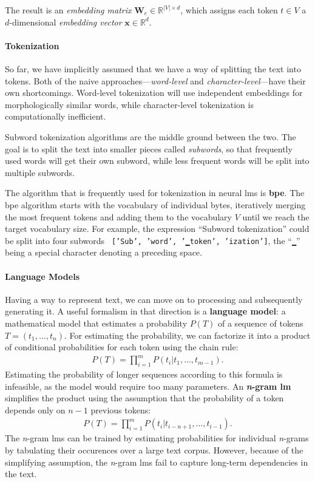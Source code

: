 The result is an \textit{embedding matrix} $\mathbf{W}_e \in \mathbb{R}^{|V|\times d}$, which assigns each token $t \in V$ a $d$-dimensional \textit{embedding vector} $\mathbf{x} \in \mathbb{R}^{d}$.

\paragraph{Tokenization} So far, we have implicitly assumed that we have a way of splitting the text into tokens. Both of the naive approaches---\textit{word-level} and \textit{character-level}---have their own shortcomings. Word-level tokenization will use independent embeddings for morphologically similar words, while character-level tokenization is computationally inefficient.

Subword tokenization algorithms are the middle ground between the two. The goal is to split the text into smaller pieces called \emph{subwords}, so that frequently used words will get their own subword, while less frequent words will be split into multiple subwords.

The algorithm that is frequently used for tokenization in neural \acp{lm} is \textbf{\ac{bpe}}. The \ac{bpe} algorithm starts with the vocabulary of individual bytes, iteratively merging the most frequent tokens and adding them to the vocabulary $V$ until we reach the target vocabulary size. For example, the expression ``Subword tokenization'' could be split into four subwords \texttt{ ['Sub', 'word', '▁token', 'ization']}, the ``\texttt{▁}'' being a special character denoting a preceding space.

\paragraph{Language Models} Having a way to represent text, we can move on to processing and subsequently generating it. A useful formalism in that direction is a \textbf{language model}: a mathematical model that estimates a probability $P(T)$ of a sequence of tokens $T = (t_1, \ldots, t_n)$. For estimating the probability, we can factorize it into a product of conditional probabilities for each token using the chain rule:
\begin{align}
    P(T) = \prod_{i=1}^m P(t_i|t_1, \hdots,t_{m-1}).
\end{align}
Estimating the probability of longer sequences according to this formula is infeasible, as the model would require too many parameters. An \textbf{\emph{n}-gram \ac{lm}} simplifies the product using the assumption that the probability of a token depends only on $n-1$ previous tokens:
\begin{align}
    P(T) = \prod_{i=1}^m P(t_i|t_{i-n+1}, \hdots,t_{i-1}).
\end{align}
The \emph{n}-gram \acp{lm} can be trained by estimating probabilities for individual \emph{n}-grams by tabulating their occurences over a large text corpus. However, because of the simplifying assumption, the \emph{n}-gram \acp{lm} fail to capture long-term dependencies in the text.

